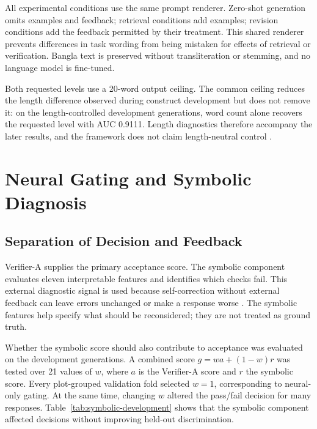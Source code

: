 All experimental conditions use the same prompt renderer. Zero-shot generation omits examples and feedback; retrieval conditions add examples; revision conditions add the feedback permitted by their treatment. This shared renderer prevents differences in task wording from being mistaken for effects of retrieval or verification. Bangla text is preserved without transliteration or stemming, and no language model is fine-tuned.

Both requested levels use a 20-word output ceiling. The common ceiling reduces the length difference observed during construct development but does not remove it: on the length-controlled development generations, word count alone recovers the requested level with AUC 0.9111. Length diagnostics therefore accompany the later results, and the framework does not claim length-neutral control \cite{b81}.

\section{Neural Gating and Symbolic Diagnosis}

\subsection{Separation of Decision and Feedback}

Verifier-A supplies the primary acceptance score. The symbolic component evaluates eleven interpretable features and identifies which checks fail. This external diagnostic signal is used because self-correction without external feedback can leave errors unchanged or make a response worse \cite{b5,b6}. The symbolic features help specify what should be reconsidered; they are not treated as ground truth.

Whether the symbolic score should also contribute to acceptance was evaluated on the development generations. A combined score $g=wa+(1-w)r$ was tested over 21 values of $w$, where $a$ is the Verifier-A score and $r$ the symbolic score. Every plot-grouped validation fold selected $w=1$, corresponding to neural-only gating. At the same time, changing $w$ altered the pass/fail decision for many responses. Table~\ref{tab:symbolic-development} shows that the symbolic component affected decisions without improving held-out discrimination.


